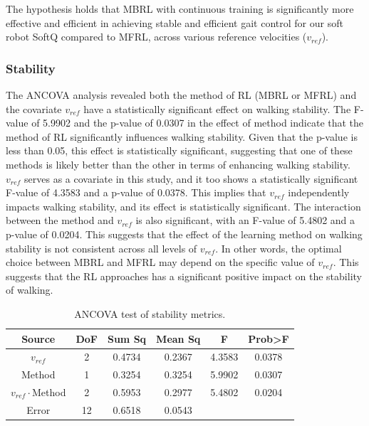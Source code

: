 The hypothesis holds that MBRL with continuous training is significantly more effective and efficient in achieving stable and efficient gait control for our soft robot SoftQ compared to MFRL, across various reference velocities ($v_{ref}$).

\subsubsection*{Stability}
The ANCOVA analysis revealed both the method of RL (MBRL or MFRL) and the covariate $v_{ref}$ have a statistically significant effect on walking stability. The F-value of 5.9902 and the p-value of 0.0307 in the effect of method indicate that the method of RL significantly influences walking stability. Given that the p-value is less than 0.05, this effect is statistically significant, suggesting that one of these methods is likely better than the other in terms of enhancing walking stability. $v_{ref}$ serves as a covariate in this study, and it too shows a statistically significant F-value of 4.3583 and a p-value of 0.0378. This implies that $v_{ref}$ independently impacts walking stability, and its effect is statistically significant. The interaction between the method and $v_{ref}$ is also significant, with an F-value of 5.4802 and a p-value of 0.0204. This suggests that the effect of the learning method on walking stability is not consistent across all levels of $v_{ref}$. In other words, the optimal choice between MBRL and MFRL may depend on the specific value of $v_{ref}$. This suggests that the  RL approaches has a significant positive impact on the stability of walking.

\begin{table}[H]
    \centering
    \begin{tabular}{c|ccccc} 
         Source&  DoF&  Sum Sq&  Mean Sq&  F& Prob>F\\ \hline
         $v_{ref}$&  2&  0.4734&  0.2367&  4.3583& 0.0378\\ 
         Method&  1&  0.3254&  0.3254&  5.9902& 0.0307\\ 
         $v_{ref}\cdot$Method&  2&  0.5953&  0.2977&  5.4802& 0.0204\\ 
         Error&  12&  0.6518&  0.0543&  & \\ 
    \end{tabular}
    \caption{ANCOVA test of stability metrics.}
    \label{tab:ANCOVA_sta}
\end{table}

